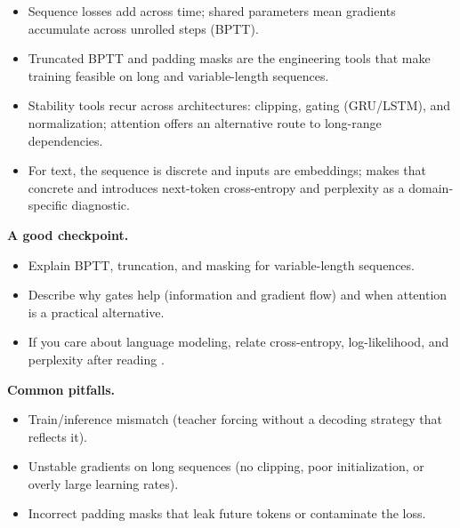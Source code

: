 \begin{tcolorbox}[summarybox, title={Key takeaways}]
\begin{itemize}
\item Sequence losses add across time; shared parameters mean gradients accumulate across unrolled steps (BPTT).
\item Truncated BPTT and padding masks are the engineering tools that make training feasible on long and variable\hyp{}length sequences.
\item Stability tools recur across architectures: clipping, gating (GRU/LSTM), and normalization; attention offers an alternative route to long\hyp{}range dependencies.
\item For text, the sequence is discrete and inputs are embeddings;  makes that concrete and introduces next\hyp{}token cross\hyp{}entropy and perplexity as a domain\hyp{}specific diagnostic.
\end{itemize}

\medskip
\noindent\textbf{A good checkpoint.}
\begin{itemize}
    \item Explain BPTT, truncation, and masking for variable\hyp{}length sequences.
    \item Describe why gates help (information and gradient flow) and when attention is a practical alternative.
    \item If you care about language modeling, relate cross\hyp{}entropy, log\hyp{}likelihood, and perplexity after reading .
\end{itemize}

\noindent\textbf{Common pitfalls.}
\begin{itemize}
    \item Train/inference mismatch (teacher forcing without a decoding strategy that reflects it).
    \item Unstable gradients on long sequences (no clipping, poor initialization, or overly large learning rates).
    \item Incorrect padding masks that leak future tokens or contaminate the loss.
\end{itemize}
\end{tcolorbox}

